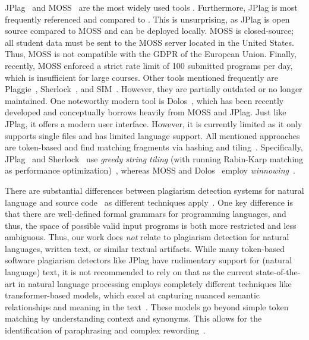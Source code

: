 JPlag~\cite{prechelt2000} and MOSS~\cite{MOSS} are the most widely used tools \cite{Aniceto2021, Novak2019}.
Furthermore, JPlag is most frequently referenced and compared to \cite{Novak2019}. This is unsurprising, as JPlag is open source compared to MOSS and can be deployed locally. MOSS is closed-source; all student data must be sent to the MOSS server located in the United States. Thus, MOSS is not compatible with the \ac{GDPR} of the European Union. Finally, recently, MOSS enforced a strict rate limit of 100 submitted programs per day, which is insufficient for large courses.
Other tools mentioned frequently are Plaggie~\cite{Plaggie}, Sherlock~\cite{Joy1999}, and SIM~\cite{SIM}. However, they are partially outdated or no longer maintained.
One noteworthy modern tool is Dolos~\cite{Maertens2022}, which has been recently developed and conceptually borrows heavily from MOSS and JPlag.
Just like JPlag, it offers a modern user interface.
However, it is currently limited as it only supports single files and has limited language support.
All mentioned approaches are token-based and find matching fragments via hashing and tiling~\cite{prechelt2002, MOSS}. Specifically, JPlag~\cite{prechelt2000, prechelt2002} and Sherlock~\cite{Joy1999} use \textit{greedy string tiling} (with running Rabin-Karp matching as performance optimization)~\cite{Wise1993, Wise1995}, whereas MOSS and Dolos~\cite{Maertens2022} employ \textit{winnowing}~\cite{Schleimer2003}.

There are substantial differences between plagiarism detection systems for natural language and source code~\cite{Fincher2019, Simon2013, Simon2014b} as different techniques apply~\cite{Lancaster2005}. One key difference is that there are well-defined formal grammars for programming languages, and thus, the space of possible valid input programs is both more restricted and less ambiguous.
Thus, our work does \textit{not} relate to plagiarism detection for natural languages, written text, or similar textual artifacts. While many token-based software plagiarism detectors like JPlag have rudimentary support for (natural language) text, it is not recommended to rely on that as the current state-of-the-art in natural language processing employs completely different techniques like transformer-based models, which excel at capturing nuanced semantic relationships and meaning in the text~\cite{khurana2023, min2023}. These models go beyond simple token matching by understanding context and synonyms. This allows for the identification of paraphrasing and complex rewording~\cite{foltynek2019, manzoor2023}.

